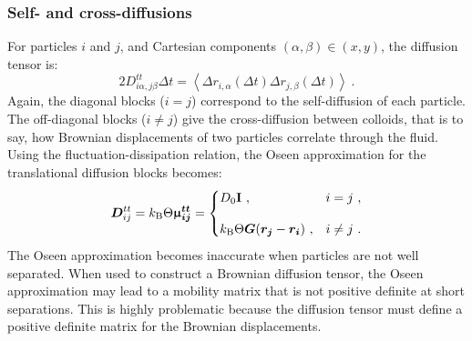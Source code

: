 \subsubsection{Self- and cross-diffusions}
For particles $i$ and $j$, and Cartesian components $(\alpha, \beta) \in (x, y)$, the diffusion tensor is:
\begin{equation}
2D^{tt}_{i\alpha,j\beta}\Delta t = \left\langle \Delta r_{i,\alpha}(\Delta t) \Delta r_{j,\beta}(\Delta t) \right\rangle ~.
\label{eq:cross_diffusions}
\end{equation}
Again, the diagonal blocks ($i=j$) correspond to the self-diffusion of each particle. The off-diagonal blocks ($i\neq j$) give the cross-diffusion between colloids, that is to say, how Brownian displacements of two particles correlate through the fluid. Using the fluctuation-dissipation relation, the Oseen approximation for the translational diffusion blocks becomes:
\begin{equation}
\bm{D}_{ij}^{tt} = k_\mathrm{B}\Theta\bm{\upmu_{ij}^{tt}} =
\begin{cases}
D_0\mathbf{I}~,
& i=j~, \\[1em]
k_\mathrm{B}\Theta\bm{G}(\bm{r_j}-\bm{r_i})~,
& i \neq j~.
\end{cases}
\label{eq:oseen_diffusion_tensor_pair}
\end{equation}
The Oseen approximation becomes inaccurate when particles are not well separated. When used to construct a Brownian diffusion tensor, the Oseen approximation may lead to a mobility matrix that is not positive definite at short separations. This is highly problematic because the diffusion tensor must define a positive definite matrix for the Brownian displacements.


